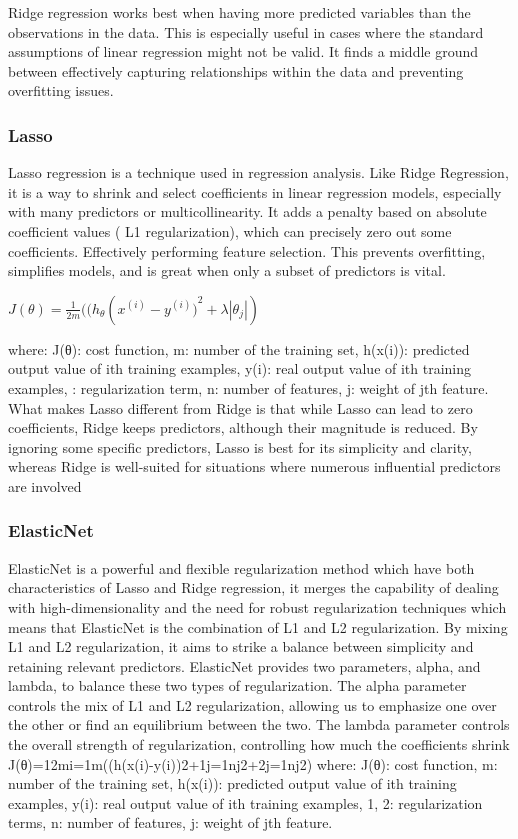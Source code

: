 Ridge regression works best when having more predicted variables than the observations in the data. This is especially useful in cases where the standard assumptions of linear regression might not be valid. It finds a middle ground between effectively capturing relationships within the data and preventing overfitting issues. 

\subsubsection{Lasso}

Lasso regression is a technique used in regression analysis. Like Ridge Regression, it is a way to shrink and select coefficients in linear regression models, especially with many predictors or multicollinearity. It adds a penalty based on absolute coefficient values ( L1 regularization), which can precisely zero out some coefficients. Effectively performing feature selection. This prevents overfitting, simplifies models, and is great when only a subset of predictors is vital.

\(J(\theta) = \frac{1}{2m}((h_{\theta}(x^{(i)} - {y^{(i)})}^{2} + \lambda\left| \theta_{j} \right|)\)

where:
J(θ): cost function,
m: number of the training set,
h(x(i)): predicted output value of ith training examples,
y(i): real output value of ith training examples,
: regularization term,
n: number of features,
j: weight of jth feature.
What makes Lasso different from Ridge is that while Lasso can lead to zero coefficients, Ridge keeps predictors, although their magnitude is reduced. By ignoring some specific predictors, Lasso is best for its simplicity and clarity, whereas Ridge is well-suited for situations where numerous influential predictors are involved

\subsubsection{ElasticNet}

ElasticNet is a powerful and flexible regularization method which have both characteristics of Lasso and Ridge regression, it merges the capability of dealing with high-dimensionality and the need for robust regularization techniques which means that ElasticNet is the combination of L1 and L2 regularization. By mixing L1 and L2 regularization, it aims to strike a balance between simplicity and retaining relevant predictors. ElasticNet provides two parameters, alpha, and lambda, to balance these two types of regularization. The alpha parameter controls the mix of L1 and L2 regularization, allowing us to emphasize one over the other or find an equilibrium between the two. The lambda parameter controls the overall strength of regularization, controlling how much the coefficients shrink
J(θ)=12mi=1m((h(x(i)-y(i))2+1j=1nj2+2j=1nj2)
where:
J(θ): cost function,
m: number of the training set,
h(x(i)): predicted output value of ith training examples,
y(i): real output value of ith training examples,
1,  2: regularization terms,
n: number of features,
j: weight of jth feature.

